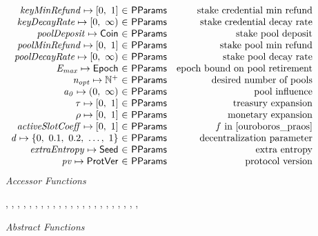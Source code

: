 \begin{figure*}[htb]
\begin{equation*}
\begin{array}{r@{~\in~}lr}
        \var{keyMinRefund} \mapsto \unitInterval & \PParams & \text{stake credential min refund}\\
        \var{keyDecayRate} \mapsto \nonnegReals & \PParams & \text{stake credential decay rate}\\
        \var{poolDeposit} \mapsto \Coin & \PParams & \text{stake pool deposit}\\
        \var{poolMinRefund} \mapsto \unitInterval & \PParams & \text{stake pool min refund}\\
        \var{poolDecayRate} \mapsto \nonnegReals & \PParams & \text{stake pool decay rate}\\
        \var{E_{max}} \mapsto \Epoch & \PParams & \text{epoch bound on pool retirement}\\
        \var{n_{opt}} \mapsto \Npos & \PParams & \text{desired number of pools}\\
        \var{a_0} \mapsto \posReals & \PParams & \text{pool influence}\\
        \tau \mapsto \unitInterval & \PParams & \text{treasury expansion}\\
        \rho \mapsto \unitInterval & \PParams & \text{monetary expansion}\\
        \var{activeSlotCoeff} \mapsto \unitInterval & \PParams & f\text{ in \cite{ouroboros_praos}}\\
        \var{d} \mapsto \{0,~0.1,~0.2,~\ldots,~1\} & \PParams & \text{decentralization parameter}\\
        \var{extraEntropy} \mapsto \Seed & \PParams & \text{extra entropy}\\
        \var{pv} \mapsto \ProtVer & \PParams & \text{protocol version}\\
      \end{array}
  \end{equation*}
  \emph{Accessor Functions}
  \begin{center}
    ,
    ,
    ,
    ,
    ,
    ,
    ,
    ,
    ,
    ,
    ,
    ,
    ,
    ,
    ,
    ,
    ,
    ,
    ,
    ,
    ,
    ,
    ,
  \end{center}
  \emph{Abstract Functions}
  \begin{equation*}

\end{equation*}
\end{figure*}
